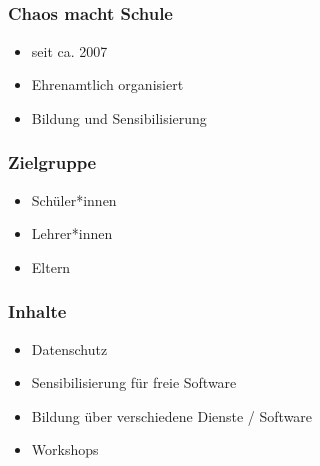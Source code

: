 \documentclass[12pt, table]{beamer}
\begin{document}
\subsection{}
  
\begin{frame}
	\frametitle{Chaos macht Schule}
	\begin{itemize}
		\item<1-> seit ca. 2007
		\item<2-> Ehrenamtlich organisiert
		\item<3-> Bildung und Sensibilisierung
	\end{itemize}
\end{frame}
  
\begin{frame}
	\frametitle{Zielgruppe}
	\begin{itemize}
		\item<1-> Schüler*innen
		\item<2-> Lehrer*innen
		\item<3-> Eltern 
	\end{itemize}
\end{frame}
  
\begin{frame}
	\frametitle{Inhalte}
	\begin{itemize}
		\item<1-> Datenschutz
		\item<2-> Sensibilisierung für freie Software
		\item<3-> Bildung über verschiedene Dienste / Software
		\item<4-> Workshops
		\begin{center}
		\end{center}
	\end{itemize}
\end{frame}
\end{document}
